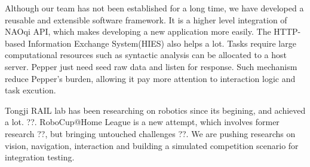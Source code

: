 Although our team has not been established for a long time, we have developed a reusable and extensible software framework. 
It is a higher level integration of NAOqi API, which makes developing a new application more easily. 
The HTTP-based Information Exchange System(HIES) also helps a lot. 
Tasks require large computational resources such as syntactic analysis can be allocated to a host server. 
Pepper just need seed raw data and listen for response. Such mechanism reduce Pepper’s burden, allowing it pay more attention to interaction logic and task excution. 

Tongji RAIL lab has been researching on robotics since its begining, and achieved a lot. ??. 
RoboCup@Home League is a new attempt, which involves former research ??, but bringing untouched challenges ??. 
We are pushing researchs on vision, navigation, interaction and building a simulated competition scenario for integration testing.
